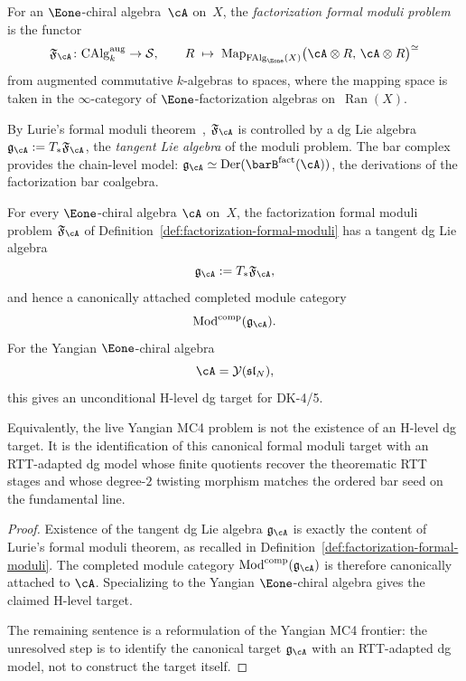 \begin{definition}
\label{def:factorization-formal-moduli}
For an $\Eone$-chiral algebra~$\cA$ on~$X$, the
\emph{factorization formal moduli problem} is the functor
\[
\mathfrak{F}_{\cA}\colon
\mathrm{CAlg}^{\mathrm{aug}}_{k}
\to \mathcal{S},
\qquad
R \;\mapsto\;
\operatorname{Map}_{\mathrm{FAlg}_{\Eone}(X)}
  \bigl(\cA \otimes R,\, \cA \otimes R\bigr)^{\simeq}
\]
from augmented commutative $k$-algebras to spaces, where the mapping
space is taken in the $\infty$-category of
$\Eone$-factorization algebras on~$\operatorname{Ran}(X)$.

By Lurie's formal moduli theorem~\cite{LurieDAGX},
$\mathfrak{F}_{\cA}$ is controlled by a dg Lie algebra
$\mathfrak{g}_{\cA} := T_{*}\mathfrak{F}_{\cA}$,
the \emph{tangent Lie algebra} of the moduli problem.
The bar complex provides the chain-level model:
$\mathfrak{g}_{\cA} \simeq
\operatorname{Der}(\barB^{\mathrm{fact}}(\cA))$,
the derivations of the factorization bar coalgebra.
\end{definition}

\begin{proposition}
\label{prop:yangian-canonical-hlevel-target}
For every $\Eone$-chiral algebra $\cA$ on~$X$, the factorization
formal moduli problem $\mathfrak{F}_{\cA}$ of
Definition~\ref{def:factorization-formal-moduli} has a tangent dg Lie
algebra
\[
\mathfrak{g}_{\cA}:=T_*\mathfrak{F}_{\cA},
\]
and hence a canonically attached completed module category
\[
\operatorname{Mod}^{\mathrm{comp}}(\mathfrak{g}_{\cA}).
\]
For the Yangian $\Eone$-chiral algebra
\[
\cA=\mathcal{Y}(\mathfrak{sl}_N),
\]
this gives an unconditional H-level dg target for DK-4/5.

Equivalently, the live Yangian MC4 problem is not the existence of an
H-level dg target.  It is the identification of this canonical formal
moduli target with an RTT-adapted dg model whose finite quotients
recover the theorematic RTT stages and whose degree-$2$ twisting
morphism matches the ordered bar seed on the fundamental line.
\end{proposition}

\begin{proof}
Existence of the tangent dg Lie algebra $\mathfrak{g}_{\cA}$ is exactly
the content of Lurie's formal moduli theorem, as recalled in
Definition~\ref{def:factorization-formal-moduli}.  The completed module
category $\operatorname{Mod}^{\mathrm{comp}}(\mathfrak{g}_{\cA})$ is
therefore canonically attached to $\cA$.  Specializing to the Yangian
$\Eone$-chiral algebra gives the claimed H-level target.

The remaining sentence is a reformulation of the Yangian MC4 frontier:
the unresolved step is to identify the canonical target
$\mathfrak{g}_{\cA}$ with an RTT-adapted dg model, not to construct the
target itself.
\end{proof}


